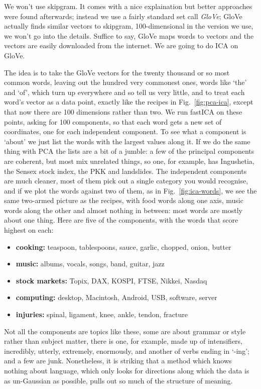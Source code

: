 \documentclass[12pt]{article}
\begin{document}
We won't use skipgram. It comes with a nice explaination but better
approaches were found afterwards; instead we use a fairly standard set
call \textsl{GloVe}; GloVe actually finds similar vectors to skipgram,
100-dimensional in the version we use, we won't go into the
details. Suffice to say, GloVe maps words to vectors and the vectors
are easily downloaded from the internet. We are going to do ICA on
GloVe.

The idea is to take the GloVe vectors for the twenty thousand or so
most common words, leaving out the hundred very commonest ones, words
like `the' and `of', which turn up everywhere and so tell us very
little, and to treat each word's vector as a data point, exactly like
the recipes in Fig.~\ref{fig:pca-ica}, except that now there are 100
dimensions rather than two. We run fastICA on these points, asking for
100 components, so that each word gets a new set of coordinates, one
for each independent component. To see what a component is `about' we
just list the words with the largest values along it. If we do the
same thing with PCA the lists are a bit of a jumble: a few of the
principal components are coherent, but most mix unrelated things, so
one, for example, has Ingushetia, the Sensex stock index, the PKK and
landslides. The independent components are much cleaner, most of them
pick out a single category you would recognise, and if we plot the
words against two of them, as in Fig.~\ref{fig:ica-words}, we see the
same two-armed picture as the recipes, with food words along one axis,
music words along the other and almost nothing in between: most words
are mostly about one thing. Here are five of the components, with the
words that score highest on each:
\begin{itemize}
\item \textbf{cooking:} teaspoon, tablespoons, sauce, garlic, chopped,
  onion, butter
\item \textbf{music:} albums, vocals, songs, band, guitar, jazz
\item \textbf{stock markets:} Topix, DAX, KOSPI, FTSE, Nikkei, Nasdaq
\item \textbf{computing:} desktop, Macintosh, Android, USB, software,
  server
\item \textbf{injuries:} spinal, ligament, knee, ankle, tendon,
  fracture
\end{itemize}
Not all the components are topics like these, some are about grammar
or style rather than subject matter, there is one, for example, made
up of intensifiers, incredibly, utterly, extremely, enormously, and
another of verbs ending in `-ing'; and a few are junk. Nonetheless, it
is striking that a method which knows nothing about language, which
only looks for directions along which the data is as un-Gaussian as
possible, pulls out so much of the structure of meaning.
\end{document}
